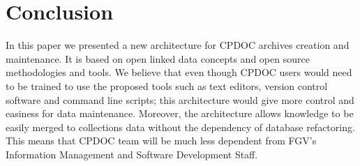 
\section{Conclusion}


In this paper we presented a new architecture for CPDOC archives
creation and maintenance. It is based on open
linked data concepts and open source methodologies and tools. We
believe that even though CPDOC users would need to be
trained to use the proposed tools such as text editors, version
control software and command line scripts; this architecture would
give more control and easiness for data maintenance. Moreover, the
architecture allows knowledge to be easily merged to collections
data without the dependency of database refactoring. This means that
CPDOC team will be much less dependent from FGV's Information
Management and Software Development Staff.



